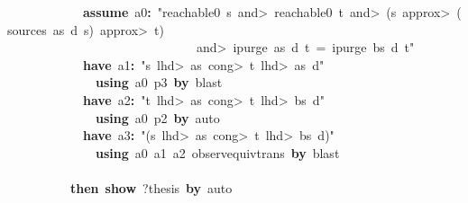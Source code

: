 \documentclass{article}
\newcommand{\syntaxKEYWORDA}[1]{\textcolor[rgb]{0.0,0.4,0.6}{\textbf{#1}}}
\newcommand{\syntaxKEYWORDC}[1]{\textcolor[rgb]{0.0,0.6,1.0}{\textbf{#1}}}
\newcommand{\syntaxLITERALA}[1]{\textcolor[rgb]{1.0,0.0,0.8}{#1}}
\newcommand{\syntaxOPERATOR}[1]{\textcolor[rgb]{0.0,0.0,0.0}{\textbf{#1}}}
\newcommand{\syntaxKEYWORDA}[1]{\textcolor[rgb]{0.0,0.4,0.6}{\textbf{#1}}}
\newcommand{\syntaxKEYWORDC}[1]{\textcolor[rgb]{0.0,0.6,1.0}{\textbf{#1}}}
\newcommand{\syntaxLITERALA}[1]{\textcolor[rgb]{1.0,0.0,0.8}{#1}}
\newcommand{\syntaxOPERATOR}[1]{\textcolor[rgb]{0.0,0.0,0.0}{\textbf{#1}}}
\newcommand{\syntaxKEYWORDA}[1]{\textcolor[rgb]{0.0,0.4,0.6}{\textbf{#1}}}
\newcommand{\syntaxKEYWORDC}[1]{\textcolor[rgb]{0.0,0.6,1.0}{\textbf{#1}}}
\newcommand{\syntaxLITERALA}[1]{\textcolor[rgb]{1.0,0.0,0.8}{#1}}
\newcommand{\syntaxOPERATOR}[1]{\textcolor[rgb]{0.0,0.0,0.0}{\textbf{#1}}}
\newcommand{\syntaxKEYWORDA}[1]{\textcolor[rgb]{0.0,0.4,0.6}{#1}}
\newcommand{\syntaxKEYWORDC}[1]{\textcolor[rgb]{0.0,0.6,1.0}{#1}}
\newcommand{\syntaxLITERALA}[1]{\textcolor[rgb]{1.0,0.0,0.8}{\textbf{#1}}}
\newcommand{\syntaxOPERATOR}[1]{\textcolor[rgb]{0.0,0.0,0.0}{#1}}
\newcommand{\syntaxKEYWORDA}[1]{\textcolor[rgb]{0.0,0.4,0.6}{\textbf{#1}}}
\newcommand{\syntaxKEYWORDC}[1]{\textcolor[rgb]{0.0,0.6,1.0}{\textbf{#1}}}
\newcommand{\syntaxLITERALA}[1]{\textcolor[rgb]{1.0,0.0,0.8}{#1}}
\newcommand{\syntaxOPERATOR}[1]{\textcolor[rgb]{0.0,0.0,0.0}{\textbf{#1}}}
\newcommand{\syntaxKEYWORDA}[1]{\textcolor[rgb]{0.0,0.4,0.6}{\textbf{#1}}}
\newcommand{\syntaxKEYWORDC}[1]{\textcolor[rgb]{0.0,0.6,1.0}{\textbf{#1}}}
\newcommand{\syntaxLITERALA}[1]{\textcolor[rgb]{1.0,0.0,0.8}{#1}}
\newcommand{\syntaxOPERATOR}[1]{\textcolor[rgb]{0.0,0.0,0.0}{\textbf{#1}}}
\begin{document}
{\ }{\ }{\ }{\ }{\ }{\ }{\ }{\ }{\ }{\ }{\ }{\ }\syntaxKEYWORDC{assume}{\ }a0\syntaxOPERATOR{:}{\ }\syntaxLITERALA{"reachable0{\ }s{\ }\<and>{\ }reachable0{\ }t{\ }\<and>{\ }(s{\ }\<approx>{\ }(sources{\ }as{\ }d{\ }s){\ }\<approx>{\ }t){\ }}\hspace*{\fill}\\
\syntaxLITERALA{{\ }{\ }{\ }{\ }{\ }{\ }{\ }{\ }{\ }{\ }{\ }{\ }{\ }{\ }{\ }{\ }{\ }{\ }{\ }{\ }{\ }{\ }{\ }{\ }{\ }{\ }{\ }{\ }{\ }{\ }\<and>{\ }ipurge{\ }as{\ }d{\ }t{\ }={\ }ipurge{\ }bs{\ }d{\ }t"}{\ }{\ }\hspace*{\fill}\\
{\ }{\ }{\ }{\ }{\ }{\ }{\ }{\ }{\ }{\ }{\ }{\ }\syntaxKEYWORDA{have}{\ }a1\syntaxOPERATOR{:}{\ }\syntaxLITERALA{"s{\ }\<lhd>{\ }as{\ }\<cong>{\ }t{\ }\<lhd>{\ }as{\ }\usebox{\atbox}{\ }d"}{\ }\hspace*{\fill}\\
{\ }{\ }{\ }{\ }{\ }{\ }{\ }{\ }{\ }{\ }{\ }{\ }{\ }{\ }\syntaxKEYWORDA{using}{\ }a0{\ }p3{\ }\syntaxKEYWORDA{by}{\ }blast\hspace*{\fill}\\
{\ }{\ }{\ }{\ }{\ }{\ }{\ }{\ }{\ }{\ }{\ }{\ }\syntaxKEYWORDA{have}{\ }a2\syntaxOPERATOR{:}{\ }\syntaxLITERALA{"t{\ }\<lhd>{\ }as{\ }\<cong>{\ }t{\ }\<lhd>{\ }bs{\ }\usebox{\atbox}{\ }d"}\hspace*{\fill}\\
{\ }{\ }{\ }{\ }{\ }{\ }{\ }{\ }{\ }{\ }{\ }{\ }{\ }{\ }\syntaxKEYWORDA{using}{\ }a0{\ }p2{\ }\syntaxKEYWORDA{by}{\ }auto\hspace*{\fill}\\
{\ }{\ }{\ }{\ }{\ }{\ }{\ }{\ }{\ }{\ }{\ }{\ }\syntaxKEYWORDA{have}{\ }a3\syntaxOPERATOR{:}{\ }\syntaxLITERALA{"(s{\ }\<lhd>{\ }as{\ }\<cong>{\ }t{\ }\<lhd>{\ }bs{\ }\usebox{\atbox}{\ }d)"}\hspace*{\fill}\\
{\ }{\ }{\ }{\ }{\ }{\ }{\ }{\ }{\ }{\ }{\ }{\ }{\ }{\ }\syntaxKEYWORDA{using}{\ }a0{\ }a1{\ }a2{\ }observ\usebox{\underscorebox}equiv\usebox{\underscorebox}trans{\ }\syntaxKEYWORDA{by}{\ }blast\hspace*{\fill}\\
{\ }{\ }{\ }{\ }{\ }{\ }{\ }{\ }{\ }{\ }\syntaxKEYWORDA{\usebox{\closecurlybracket}}\hspace*{\fill}\\
{\ }{\ }{\ }{\ }{\ }{\ }{\ }{\ }{\ }{\ }\syntaxKEYWORDA{then}{\ }\syntaxKEYWORDC{show}{\ }?thesis{\ }\syntaxKEYWORDA{by}{\ }auto\hspace*{\fill}\\
\end{document}
